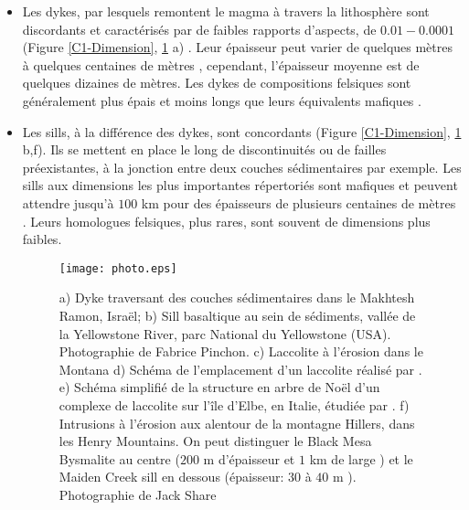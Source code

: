 \begin{itemize}
\item  Les  dykes,  par  lesquels  remontent le  magma  à  travers  la
  lithosphère sont discordants et caractérisés par de faibles rapports
  d'aspects,    de     $0.01-0.0001$    (Figure    \ref{C1-Dimension},
  \ref{C1-picture}                                                  a)
  \citep{Rubin:1995upa,Schultz:2008ih,Kavanagh:2011kf}.           Leur
  épaisseur peut  varier de  quelques mètres  à quelques  centaines de
  mètres       \citep{Walker:1989jq,Krumbholz:2014dj},      cependant,
  l'épaisseur moyenne est de quelques dizaines de mètres. Les dykes de
  compositions felsiques  sont généralement plus épais  et moins longs
  que leurs équivalents mafiques \citep{Rubin:1995upa}.

\item Les sills,  à la différence des dykes,  sont concordants (Figure
  \ref{C1-Dimension}, \ref{C1-picture} b,f).  Ils  se mettent en place
  le long de discontinuités ou de failles préexistantes, à la jonction
  entre  deux  couches  sédimentaires  par  exemple.   Les  sills  aux
  dimensions les plus importantes répertoriés sont mafiques et peuvent
  attendre jusqu'à $100$ km pour des épaisseurs de plusieurs centaines
  de  mètres  \citep{Cruden:tg}.   Leurs  homologues  felsiques,  plus
  rares, sont souvent de dimensions plus faibles.

  \begin{figure}[htpb]
    \begin{center}
      \graphicspath{ {/Users/thorey/Documents/These/Manuscript/Figure/Chapter1/} }
      \texttt{[image: photo.eps]}
      \caption{a) Dyke  traversant des  couches sédimentaires  dans le
        Makhtesh  Ramon,  Israël;  b)   Sill  basaltique  au  sein  de
        sédiments, vallée  de la  Yellowstone River, parc  National du
        Yellowstone  (USA).   Photographie  de  Fabrice  Pinchon.   c)
        Laccolite   à  l'érosion   dans  le   Montana  d)   Schéma  de
        l'emplacement       d'un      laccolite       réalisé      par
        \citet{Gilbert:1877uk}. e) Schéma simplifié de la structure en
        arbre de Noël d'un complexe  de laccolite sur l'île d'Elbe, en
        Italie,  étudiée par  \citet{Rocchi:2010dn}.  f)  Intrusions à
        l'érosion aux alentour de la  montagne Hillers, dans les Henry
        Mountains.   On peut  distinguer  le Black  Mesa Bysmalite  au
        centre   ($200$   m   d'épaisseur   et   $1$   km   de   large
        \citep{Morgan:2008hj})  et le  Maiden  Creek  sill en  dessous
        (épaisseur:   $30$    à   $40$    m   \citep{Horsman:2005ct}).
        Photographie de Jack Share}
      \label{C1-picture}
    \end{center}
  \end{figure}


\end{itemize}
